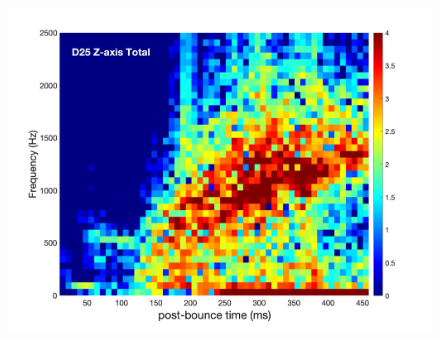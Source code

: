 \documentclass[aspectratio=169]{beamer}
\begin{document}
\begin{frame}
\begin{columns}[c]
      \begin{figure}
        \includegraphics[width=1.0\textwidth]{Figures/D25_spectrogram_TOTAL.pdf}
      \end{figure}

  \end{columns}

\end{frame}
\end{document}
